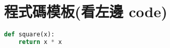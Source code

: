 \section*{程式碼模板(看左邊 code)}
\begin{lstlisting}[language=Python, caption={範例程式碼：Python 計算平方值}, label={lst:example}]
def square(x):
    return x * x
\end{lstlisting}
